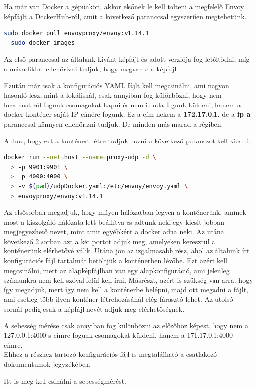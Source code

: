 \documentclass[a4paper,oneside]{article}
\begin{document}
Ha már van Docker a gépünkön, akkor elsőnek le kell tölteni a megfelelő Envoy
képfájlt a DockerHub-ról, amit a következő paranccsal egyszerűen megtehetünk.
\begin{lstlisting}[language=bash]
  sudo docker pull envoyproxy/envoy:v1.14.1
  sudo docker images
\end{lstlisting}
Az első paranccsal az általunk kívánt képfájl és adott verziója fog letöltődni,
míg a másodikkal ellenőrizni tudjuk, hogy megvan-e a képfájl.

Ezután már csak a konfigurációs YAML fájlt kell megcsinálni, ami nagyon hasonló
lesz, mint a lokálisnál, csak annyiban fog különbözni, hogy nem localhost-ról
fogunk csomagokat kapni és nem is oda fogunk küldeni, hanem a docker konténer
saját IP címére fogunk. Ez a cím nekem a \textbf{172.17.0.1}, de a \textbf{ip a}
paranccsal könnyen ellenőrizni tudjuk. De minden más marad a régiben.

Ahhoz, hogy ezt a konténert létre tudjuk hozni a következő parancsot kell kiadni:
\begin{lstlisting}[language=bash]
  docker run --net=host --name=proxy-udp -d \
  > -p 9901:9901 \
  > -p 4000:4000 \
  > -v $(pwd)/udpDocker.yaml:/etc/envoy/envoy.yaml \
  > envoyproxy/envoy:v1.14.1
\end{lstlisting}
Az elsősorban megadjuk, hogy milyen hálózatban legyen a konténerünk, aminek most a
kiszolgáló hálózata lett beállítva és adtunk neki egy kicsit jobban megjegyezhető
nevet, mint amit egyébként a docker adna neki. Az utána következő 2 sorban azt
a két portot adjuk meg, amelyeken keresztül a konténerünk elérhetővé válik. Utána
jön az izgalmasabb rész, ahol az általunk írt konfigurációs fájl tartalmát betöltjük a
konténerben lévőbe. Ezt azért kell megcsinálni, mert az alapképfájlban van egy
alapkonfiguráció, ami jelenleg számunkra nem kell szóval felül kell írni.
Másrészt, azért is szükség van arra, hogy így megadjuk, mert így nem kell a
konténerbe belépni, majd ott megadni a fájlt, ami esetleg több ilyen konténer
létrehozásánál elég fárasztó lehet. Az utolsó sornál pedig csak a képfájl nevét
adjuk meg elérhetőségnek.

A sebesség mérése csak annyiban fog különbözni az előzőhöz képest, hogy nem a
127.0.0.1:4000-s címre fogunk csomagokat küldeni, hanem a 171.17.0.1:4000 címre.\\

Ehhez a részhez tartozó konfigurációs fájl is megtalálható a csatlakozó
dokumentumok jegyzékében.

Itt is meg kell csinálni a sebességmérést.
\end{document}
